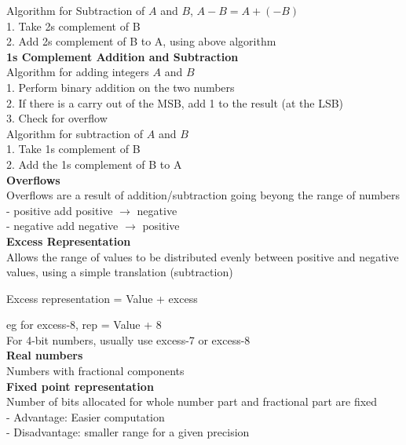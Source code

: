 \documentclass[10pt, a4paper]{article}
\begin{document}
\begin{multicols*}{3}
		Algorithm for Subtraction of $A$ and $B$, $A - B = A + (-B)$\\
		1. Take 2s complement of B\\
		2. Add 2s complement of B to A, using above algorithm\\
		
		\textbf{1s Complement Addition and Subtraction}\\
		Algorithm for adding integers $A$ and $B$\\
		1. Perform binary addition on the two numbers\\
		2. If there is a carry out of the MSB, add 1 to the result (at the LSB)\\
		3. Check for overflow\\
		
		Algorithm for subtraction of $A$ and $B$\\
		1. Take 1s complement of B\\
		2. Add the 1s complement of B to A\\
		
		\textbf{Overflows}\\
		Overflows are a result of addition/subtraction going beyong the range of numbers\\
		- positive add positive $\rightarrow$ negative\\
		- negative add negative $\rightarrow$ positive\\
		
		\textbf{Excess Representation}\\
		Allows the range of values to be distributed evenly between positive and negative values, using a simple translation (subtraction)
		\begin{center}
			Excess representation = Value + excess
		\end{center}
		eg for excess-8, rep = Value + 8\\
		For 4-bit  numbers, usually use excess-7 or excess-8\\
		
		\textbf{Real numbers}\\
		Numbers with fractional components\\
		
		\textbf{Fixed point representation}\\
		Number of bits allocated for whole number part and fractional part are fixed\\
		- Advantage: Easier computation\\
		- Disadvantage: smaller range for a given precision\\		
		

\end{multicols*}
\end{document}
